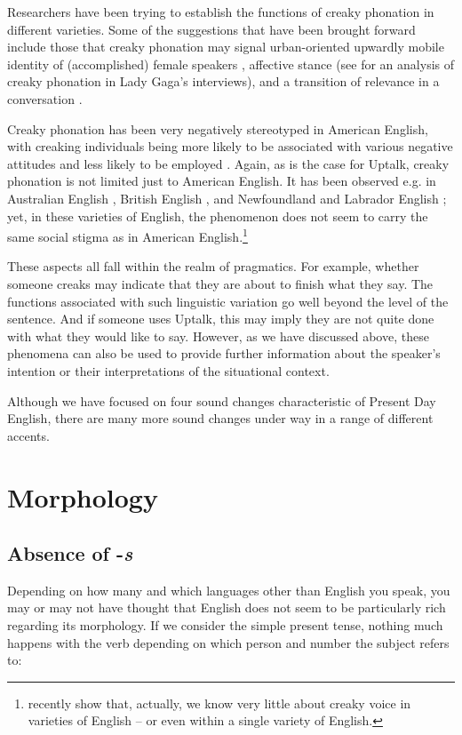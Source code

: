 Researchers have been trying to establish the functions of creaky phonation in different varieties. Some of the suggestions that have been brought forward include those that creaky phonation may signal urban-oriented upwardly mobile identity of (accomplished) female speakers \citep{Yuasa2010}, affective stance (see \citealp{Esposito2017} for an analysis of creaky phonation in Lady Gaga's interviews), and a transition of relevance in a conversation \citep{GrivicicNilep2004}.

Creaky phonation has been very negatively stereotyped in American English, with creaking individuals being more likely to be associated with various negative attitudes and less likely to be employed \citep{AndersonKlofstadMayewVenkatachalam2014}. Again, as is the case for Uptalk, creaky phonation is not limited just to American English. It has been observed e.g. in Australian English \citep{Sicoli2015}, British English \citep{Sicoli2015}, and Newfoundland and Labrador English \citep[154]{Clarke2010}; yet, in these varieties of English, the phenomenon does not seem to carry the same social stigma as in American English.\footnote{\citet{DallastonDocherty2020} recently show that, actually, we know very little about creaky voice in varieties of English -- or even within a single variety of English.}

These aspects all fall within the realm of pragmatics. For example, whether someone creaks may indicate that they are about to finish what they say. The functions associated with such linguistic variation go well beyond the level of the sentence. And if someone uses Uptalk, this may imply they are not quite done with what they would like to say. However, as we have discussed above, these phenomena can also be used to provide further information about the speaker's intention or their interpretations of the situational context.

Although we have focused on four sound changes characteristic of Present Day English, there are many more sound changes under way in a range of different accents.

\section{Morphology}
\subsection{Absence of -\textit{s}}\label{PDE-s}
Depending on how many and which languages other than English you speak, you may or may not have thought that English does not seem to be particularly rich regarding its  morphology. If we consider the simple present tense, nothing much happens with the verb depending on which person and number the subject refers to:


